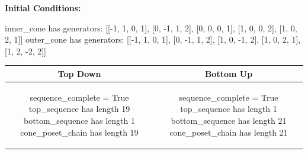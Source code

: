 \documentclass[10pt]{article}
\begin{document}
\textbf{Initial Conditions:}
\begin{SAGE}
inner_cone has generators: 
[[-1, 1, 0, 1], [0, -1, 1, 2], [0, 0, 0, 1], [1, 0, 0, 2], [1, 0, 2, 1]]
outer_cone has generators: 
[[-1, 1, 0, 1], [0, -1, 1, 2], [1, 0, -1, 2], [1, 0, 2, 1], [1, 2, -2, 2]]

\end{SAGE}
\begin{tabular}{c|c}
\textbf{Top Down} & \textbf{Bottom Up} \\ \hline  
\begin{SAGE}
sequence_complete = True
top_sequence has length 19
bottom_sequence has length 1
cone_poset_chain has length 19
\end{SAGE} 
&
\begin{SAGE}
sequence_complete = True
top_sequence has length 1
bottom_sequence has length 21
cone_poset_chain has length 21
\end{SAGE} 
\\ \hline


\end{tabular}
\end{document}
